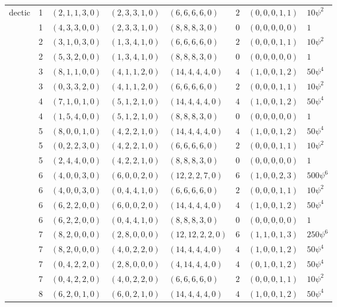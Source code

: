 \documentclass[11pt]{amsart}
\theoremstyle{definition}
\theoremstyle{remark}
\begin{document}
\begin{table}[t]
\begin{tabular}{lrlllrll}
\midrule
dectic & 1 & $(2,1,1,3,0)$ & $(2,3,3,1,0)$ & $(6,6,6,6,0)$ & $2$ & $(0,0,0,1,1)$ & $10\psi^{2}$\\
 & 1 & $(4,3,3,0,0)$ & $(2,3,3,1,0)$ & $(8,8,8,3,0)$ & $0$ & $(0,0,0,0,0)$ & $1$\\
 & 2 & $(3,1,0,3,0)$ & $(1,3,4,1,0)$ & $(6,6,6,6,0)$ & $2$ & $(0,0,0,1,1)$ & $10\psi^{2}$\\
 & 2 & $(5,3,2,0,0)$ & $(1,3,4,1,0)$ & $(8,8,8,3,0)$ & $0$ & $(0,0,0,0,0)$ & $1$\\
 & 3 & $(8,1,1,0,0)$ & $(4,1,1,2,0)$ & $(14,4,4,4,0)$ & $4$ & $(1,0,0,1,2)$ & $50\psi^{4}$\\
 & 3 & $(0,3,3,2,0)$ & $(4,1,1,2,0)$ & $(6,6,6,6,0)$ & $2$ & $(0,0,0,1,1)$ & $10\psi^{2}$\\
 & 4 & $(7,1,0,1,0)$ & $(5,1,2,1,0)$ & $(14,4,4,4,0)$ & $4$ & $(1,0,0,1,2)$ & $50\psi^{4}$\\
 & 4 & $(1,5,4,0,0)$ & $(5,1,2,1,0)$ & $(8,8,8,3,0)$ & $0$ & $(0,0,0,0,0)$ & $1$\\
 & 5 & $(8,0,0,1,0)$ & $(4,2,2,1,0)$ & $(14,4,4,4,0)$ & $4$ & $(1,0,0,1,2)$ & $50\psi^{4}$\\
 & 5 & $(0,2,2,3,0)$ & $(4,2,2,1,0)$ & $(6,6,6,6,0)$ & $2$ & $(0,0,0,1,1)$ & $10\psi^{2}$\\
 & 5 & $(2,4,4,0,0)$ & $(4,2,2,1,0)$ & $(8,8,8,3,0)$ & $0$ & $(0,0,0,0,0)$ & $1$\\
 & 6 & $(4,0,0,3,0)$ & $(6,0,0,2,0)$ & $(12,2,2,7,0)$ & $6$ & $(1,0,0,2,3)$ & $500\psi^{6}$\\
 & 6 & $(4,0,0,3,0)$ & $(0,4,4,1,0)$ & $(6,6,6,6,0)$ & $2$ & $(0,0,0,1,1)$ & $10\psi^{2}$\\
 & 6 & $(6,2,2,0,0)$ & $(6,0,0,2,0)$ & $(14,4,4,4,0)$ & $4$ & $(1,0,0,1,2)$ & $50\psi^{4}$\\
 & 6 & $(6,2,2,0,0)$ & $(0,4,4,1,0)$ & $(8,8,8,3,0)$ & $0$ & $(0,0,0,0,0)$ & $1$\\
 & 7 & $(8,2,0,0,0)$ & $(2,8,0,0,0)$ & $(12,12,2,2,0)$ & $6$ & $(1,1,0,1,3)$ & $250\psi^{6}$\\
 & 7 & $(8,2,0,0,0)$ & $(4,0,2,2,0)$ & $(14,4,4,4,0)$ & $4$ & $(1,0,0,1,2)$ & $50\psi^{4}$\\
 & 7 & $(0,4,2,2,0)$ & $(2,8,0,0,0)$ & $(4,14,4,4,0)$ & $4$ & $(0,1,0,1,2)$ & $50\psi^{4}$\\
 & 7 & $(0,4,2,2,0)$ & $(4,0,2,2,0)$ & $(6,6,6,6,0)$ & $2$ & $(0,0,0,1,1)$ & $10\psi^{2}$\\
 & 8 & $(6,2,0,1,0)$ & $(6,0,2,1,0)$ & $(14,4,4,4,0)$ & $4$ & $(1,0,0,1,2)$ & $50\psi^{4}$\\

\end{tabular}
\end{table}
\end{document}
